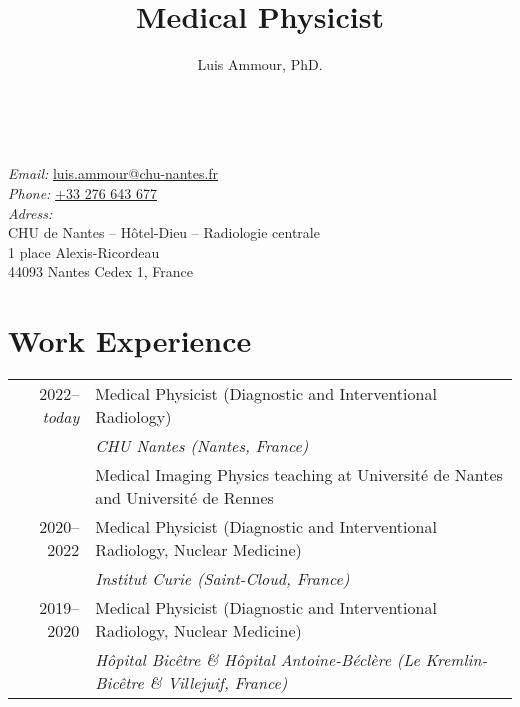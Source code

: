 \documentclass[a4paper, 10pt]{article}
\author{Luis Ammour, PhD.}
\title{Medical Physicist}
\begin{document}
    \pagestyle{empty}
    
    {
        \makeatletter
        \sffamily
        {\huge \@author}\\
        {\large \textsc{\@title}}
    }

    \bigskip
        
    \normalsize
    \rmfamily
    \textit{Email:} \href{mailto:luis.ammour@chu-nantes.fr}{{luis.ammour@chu-nantes.fr}}\\
    \textit{Phone:} \href{tel:+33276643677}{{+33 276 643 677}}\\
    \textit{Adress:}\\
    CHU de Nantes -- Hôtel-Dieu -- Radiologie centrale\\
    1 place Alexis-Ricordeau\\
    44093 Nantes Cedex 1, France
    
        
    
    \vfill
       
    \section{Work Experience}
    
        \begin{tabularx}{\textwidth}{r|X}
    
            2022--\emph{today} & Medical Physicist (Diagnostic and Interventional Radiology)\\
            & \emph{CHU Nantes (Nantes, France)}\\
            & Medical Imaging Physics teaching at Université de Nantes and Université de Rennes\\
    
            \rule{0pt}{18pt}
    
            2020--2022 & Medical Physicist (Diagnostic and Interventional Radiology, Nuclear Medicine) \\
            & \emph{Institut Curie (Saint-Cloud, France)}\\
    
            \rule{0pt}{18pt}
    
            2019--2020 & Medical Physicist (Diagnostic and Interventional Radiology, Nuclear Medicine)\\
            & \emph{Hôpital Bicêtre \& Hôpital Antoine-Béclère (Le Kremlin-Bicêtre \& Villejuif, France)}\\
          
        \end{tabularx}
    
\end{document}
